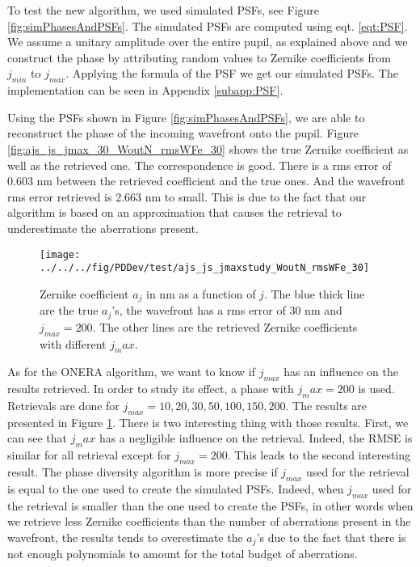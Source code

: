 To test the new algorithm, we used simulated PSFs, see Figure \ref{fig:simPhasesAndPSFs}. The simulated PSFs are computed using eqt. \eqref{eqt:PSF}. We assume a unitary amplitude over the entire pupil, as explained above and we construct the phase by attributing random values to Zernike coefficients from $j_{min}$ to $j_{max}$. Applying the formula of the PSF we get our simulated PSFs. The implementation can be seen in Appendix \ref{subapp:PSF}.

Using the PSFs shown in Figure \ref{fig:simPhasesAndPSFs}, we are able to reconstruct the phase of the incoming wavefront onto the pupil. Figure \ref{fig:ajs_js_jmax_30_WoutN_rmsWFe_30} shows the true Zernike coefficient as well as the retrieved one. The correspondence is good. There is a rms error of 0.603 nm between the retrieved coefficient and the true ones. And the wavefront rms error retrieved is 2.663 nm to small. This is due to the fact that our algorithm is based on an approximation that causes the retrieval to underestimate the aberrations present.

\begin{figure}
\begin{center}
\texttt{[image: ../../../fig/PDDev/test/ajs\_js\_jmaxstudy\_WoutN\_rmsWFe\_30]}
\decoRule
\caption{Zernike coefficient $a_j$ in nm as a function of $j$. The blue thick line are the true $a_j$'s, the wavefront has a rms error of 30 nm and $j_{max}= 200$. The other lines are the retrieved Zernike coefficients with different $j_max$.}
\label{fig:ajs_js_jmaxstudy_WoutN_rmsWFe_30}
\end{center}
\end{figure}

As for the ONERA algorithm, we want to know if $j_{max}$ has an influence on the results retrieved. In order to study its effect, a phase with $j_max = 200$ is used. Retrievals are done for $j_{max} = 10, 20 , 30, 50,100,150,200$. The results are presented in Figure \ref{fig:ajs_js_jmaxstudy_WoutN_rmsWFe_30}. There is two interesting thing with those results. First, we can see that $j_max$ has a negligible influence on the retrieval. Indeed, the RMSE is similar for all retrieval except for $j_{max} = 200$. This leads to the second interesting result. The phase diversity algorithm is more precise if $j_{max}$ used for the retrieval is equal to the one used to create the simulated PSFs. Indeed, when $j_{max}$ used for the retrieval is smaller than the one used to create the PSFs, in other words when we retrieve less Zernike coefficients than the number of aberrations present in the wavefront, the results tends to overestimate the $a_j$'s due to the fact that there is not enough polynomials to amount for the total budget of aberrations.

